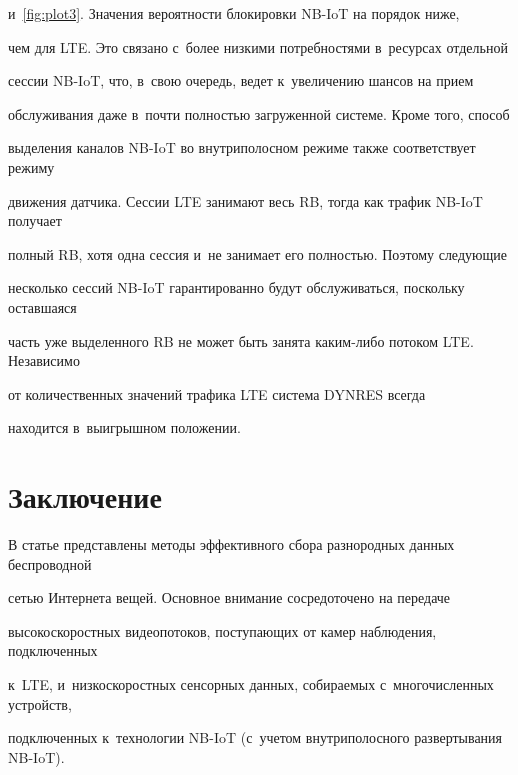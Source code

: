 и~\ref{fig:plot3}. Значения вероятности блокировки NB-IoT на порядок ниже, 


чем для LTE. Это связано с~более низкими потребностями в~ресурсах отдельной 


сессии NB-IoT, что, в~свою очередь, ведет к~увеличению шансов на прием 


обслуживания даже в~почти полностью загруженной системе. Кроме того, способ 


выделения каналов NB-IoT во внутриполосном режиме также соответствует режиму 


движения датчика. Сессии LTE занимают весь RB, тогда как трафик NB-IoT получает 


полный RB, хотя одна сессия и~не занимает его полностью. Поэтому следующие 


несколько сессий NB-IoT гарантированно будут обслуживаться, поскольку оставшаяся 


часть уже выделенного RB не может быть занята каким-либо потоком LTE. Независимо 


от количественных значений трафика LTE система \mbox{DYNRES} всегда 


находится в~выигрышном положении.





\vspace*{-7pt}





\section{Заключение}


\label{conclus}





\vspace*{-3pt}





В статье представлены методы эффективного сбора разнородных данных беспроводной 


сетью Интернета вещей. Основное внимание сосредоточено на передаче 


высокоскоростных видеопотоков, поступающих от камер наблюдения, подключенных 


к~LTE, и~низкоскоростных сенсорных данных, собираемых с~многочисленных устройств, 


подключенных к~технологии NB-IoT (с~учетом внут\-ри\-по\-лос\-но\-го развертывания NB-IoT). 


